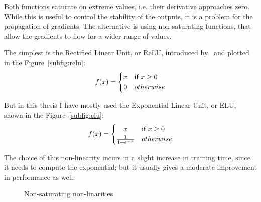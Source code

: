 Both functions saturate on extreme values, 
i.e. their derivative approaches zero.
While this is useful to control the stability of the outputs, it is a problem for the propagation of gradients.
The alternative is using non-saturating functions, that allow the gradients to flow for a wider range of values.

The simplest is the Rectified Linear Unit, or ReLU, introduced by~\citet{relu} and plotted in the Figure~\ref{subfig:relu}:
\begin{equation*}
f(x) =  \begin{cases}
\hfil x &  \text{if } x \geq 0 \\
\hfil 0 & otherwise
\end{cases}
\end{equation*}

But in this thesis I have mostly used the Exponential Linear Unit, or ELU, shown in the Figure~\ref{subfig:elu}:
\begin{equation*}
f(x) =  \begin{cases}
\hfil x &  \text{if } x \geq 0 \\
\frac{1}{1 + e^{-x}} & otherwise
\end{cases}
\end{equation*}

The choice of this non-linearity incurs in a slight increase in training time, since it needs to compute the exponential; but it usually gives a moderate improvement in performance as well.

\begin{figure}[tb]
	\hfil
	\caption{Non-saturating non-linarities}\label{fig:non_linear2}
\end{figure}

